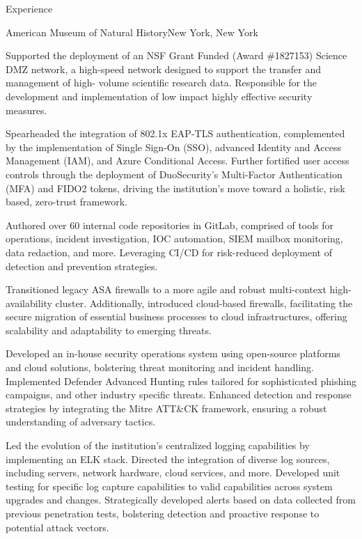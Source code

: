 \documentclass[]{mcdowellcv}
\begin{document}
\begin{cvsection}{Experience}
\begin{jobentry}{American Museum of Natural History}{New York, New York}
        \begin{jobprojects}
            \item Supported the deployment of an NSF Grant Funded (Award \#1827153) Science DMZ
    network, a high-speed network designed to support the transfer and management of high-
    volume scientific research data. Responsible for the development and implementation of
    low impact highly effective security measures.
            \item Spearheaded the integration of 802.1x EAP-TLS authentication, complemented by the implementation of Single Sign-On (SSO), advanced Identity and Access Management (IAM), and Azure Conditional Access. Further fortified user access controls through the deployment of DuoSecurity's Multi-Factor Authentication (MFA) and FIDO2 tokens, driving the institution's move toward a holistic, risk based, zero-trust framework.
            \item Authored over 60 internal code repositories in GitLab, comprised of tools for operations, incident investigation, IOC automation, SIEM mailbox monitoring, data redaction, and more. Leveraging CI/CD for risk-reduced deployment of detection and prevention strategies.
            \item Transitioned legacy ASA firewalls to a more agile and robust multi-context high-availability cluster. Additionally, introduced cloud-based firewalls, facilitating the secure migration of essential business processes to cloud infrastructures, offering scalability and adaptability to emerging threats.
            \item Developed an in-house security operations system using open-source platforms and cloud solutions, bolstering threat monitoring and incident handling. Implemented Defender Advanced Hunting rules tailored for sophisticated phishing campaigns, and other industry specific threats. Enhanced detection and response strategies by integrating the Mitre ATT\&CK framework, ensuring a robust understanding of adversary tactics.
            \item Led the evolution of the institution's centralized logging capabilities by implementing an ELK stack. Directed the integration of diverse log sources, including servers, network hardware, cloud services, and more. Developed unit testing for specific log capture capabilities to valid capabilities across system upgrades and changes. Strategically developed alerts based on data collected from previous penetration tests, bolstering detection and proactive response to potential attack vectors.

\end{jobprojects}
\end{jobentry}
\end{cvsection}
\end{document}
